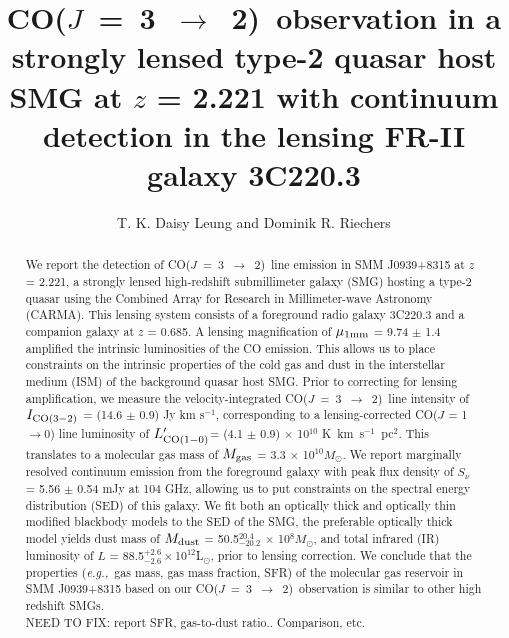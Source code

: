 \documentclass[twocolumn,apj,numberedappendix]{emulateapj}
\newcommand{\Msun}{\mbox{$M_{\odot}$}}
\newcommand{\Lsun}{\mbox{L$_{\odot}$}}
\newcommand{\rarr}{$\rightarrow$}
\newcommand{\CO}{\mbox{CO($J$ = 3 $\rightarrow$ 2) }}
\newcommand{\Lp}{\mbox{$L^{\prime}_{\rm CO(1-0)}$}}
\newcommand{\LpU}{\mbox{K km s$^{-1}$ pc$^2$}}
\newcommand{\eg}{{\sl e.g.,~}}
\newcommand{\pmOne}{$^{-1}$}
\begin{document}
\title{\CO observation in a strongly lensed type-2 quasar host SMG at $z$ = 2.221 with
continuum detection in the lensing FR-II galaxy 3C220.3}
\author{T. K. Daisy Leung and Dominik R. Riechers}

\begin{abstract}
We report the detection of \CO line emission in SMM J0939+8315 at $z$ = 2.221, a
strongly lensed high-redshift submillimeter galaxy (SMG) hosting a type-2 quasar using
the Combined Array for Research in Millimeter-wave Astronomy (CARMA). This lensing system consists of a
foreground radio galaxy 3C220.3 and a companion galaxy at $z$ = 0.685. A lensing magnification of $\mu_{\rm 1 mm}$ = 9.74 $\pm$ 1.4 amplified the intrinsic luminosities of the CO emission. This allows us to place constraints on the intrinsic properties
of the cold gas and dust in the interstellar medium (ISM) of the background quasar host SMG. Prior to correcting for lensing 
amplification, we measure the
velocity-integrated \CO line intensity of $I_{\rm CO(3-2)}$ = (14.6 $\pm$ 0.9) Jy km s\pmOne,
corresponding to a lensing-corrected CO($J$ = 1 \rarr 0) line luminosity of \Lp = (4.1 $\pm$ 
0.9) $\times$ 10$^{10}$ \LpU. This
translates to a molecular gas mass of $M_{\rm gas}$ = 3.3 $\times$ 10$^{10}M_\odot$. We report marginally resolved continuum 
emission from the foreground galaxy with peak flux density of $S_\nu$ = 5.56 $\pm$ 0.54 mJy
 at 104 GHz, allowing us to put constraints on the spectral energy distribution (SED) of this galaxy. We 
fit
 both an optically thick and optically thin modified blackbody models to the SED of the SMG, the preferable optically thick model  yields dust mass of $M_{\rm
dust}$ = 50.5$^{20.4}_{-20.2}$ $\times$ 10$^8$\Msun, and total infrared (IR) luminosity of $L$ = 88.5$^{+2.6}
_{-2.6}\times$10$^{12}$\Lsun, prior to lensing correction. We conclude that the properties (\eg gas mass, gas mass 
fraction, SFR) of the molecular gas reservoir in SMM
J0939+8315 based on our \CO observation is similar to other high redshift
SMGs. \\
NEED TO  FIX: 
report SFR, gas-to-dust ratio.. Comparison, etc. 
\end{abstract}
\end{document}
